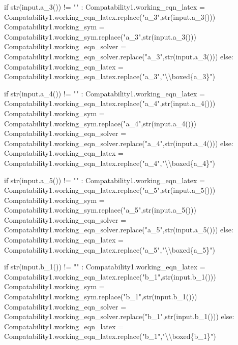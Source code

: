 \documentclass[
  letterpaper,
  DIV=11,
  numbers=noendperiod]{scrreprt}
\newenvironment{Shaded}{\begin{snugshade}}{\end{snugshade}}
\newcommand{\NormalTok}[1]{\textcolor[rgb]{0.00,0.23,0.31}{#1}}
\begin{document}
\begin{Shaded}
\begin{Highlighting}[]
\NormalTok{            if str(input.a\_3()) != "" : }
\NormalTok{                Compatability1.working\_eqn\_latex = Compatability1.working\_eqn\_latex.replace("a\_3",str(input.a\_3()))}
\NormalTok{                Compatability1.working\_sym = Compatability1.working\_sym.replace("a\_3",str(input.a\_3()))}
\NormalTok{                Compatability1.working\_eqn\_solver = Compatability1.working\_eqn\_solver.replace("a\_3",str(input.a\_3()))}
\NormalTok{            else:}
\NormalTok{                Compatability1.working\_eqn\_latex = Compatability1.working\_eqn\_latex.replace("a\_3","\textbackslash{}\textbackslash{}boxed\{a\_3\}")}
            
\NormalTok{            if str(input.a\_4()) != "" : }
\NormalTok{                Compatability1.working\_eqn\_latex = Compatability1.working\_eqn\_latex.replace("a\_4",str(input.a\_4()))}
\NormalTok{                Compatability1.working\_sym = Compatability1.working\_sym.replace("a\_4",str(input.a\_4()))}
\NormalTok{                Compatability1.working\_eqn\_solver = Compatability1.working\_eqn\_solver.replace("a\_4",str(input.a\_4()))}
\NormalTok{            else:}
\NormalTok{                Compatability1.working\_eqn\_latex = Compatability1.working\_eqn\_latex.replace("a\_4","\textbackslash{}\textbackslash{}boxed\{a\_4\}")}
            
\NormalTok{            if str(input.a\_5()) != "" : }
\NormalTok{                Compatability1.working\_eqn\_latex = Compatability1.working\_eqn\_latex.replace("a\_5",str(input.a\_5()))}
\NormalTok{                Compatability1.working\_sym = Compatability1.working\_sym.replace("a\_5",str(input.a\_5()))}
\NormalTok{                Compatability1.working\_eqn\_solver = Compatability1.working\_eqn\_solver.replace("a\_5",str(input.a\_5()))}
\NormalTok{            else:}
\NormalTok{                Compatability1.working\_eqn\_latex = Compatability1.working\_eqn\_latex.replace("a\_5","\textbackslash{}\textbackslash{}boxed\{a\_5\}")}
                    
\NormalTok{            if str(input.b\_1()) != "" : }
\NormalTok{                Compatability1.working\_eqn\_latex = Compatability1.working\_eqn\_latex.replace("b\_1",str(input.b\_1()))}
\NormalTok{                Compatability1.working\_sym = Compatability1.working\_sym.replace("b\_1",str(input.b\_1()))}
\NormalTok{                Compatability1.working\_eqn\_solver = Compatability1.working\_eqn\_solver.replace("b\_1",str(input.b\_1()))}
\NormalTok{            else:}
\NormalTok{                Compatability1.working\_eqn\_latex = Compatability1.working\_eqn\_latex.replace("b\_1","\textbackslash{}\textbackslash{}boxed\{b\_1\}")}
            

\end{Highlighting}
\end{Shaded}
\end{document}

